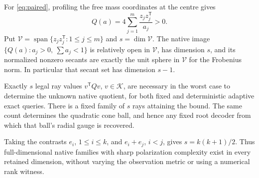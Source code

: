 \begin{theorem}\label{thm:paired}
For \eqref{eq:paired}, profiling the free mass coordinates at the centre gives
\begin{equation}\label{eq:paired-Q}
 Q(a)=4\sum_{j=1}^m\frac{z_jz_j^{\mathsf T}}{a_j}>0.
\end{equation}
Put $\mathcal V=\operatorname{span}\{z_jz_j^{\mathsf T}:1\le j\le m\}$ and $s=\dim\mathcal V$. The native image $\{Q(a):a_j>0,\ \sum a_j<1\}$ is relatively open in $\mathcal V$, has dimension $s$, and its normalized nonzero secants are exactly the unit sphere in $\mathcal V$ for the Frobenius norm. In particular that secant set has dimension $s-1$.

Exactly $s$ legal ray values $v^{\mathsf T}Qv$, $v\in\mathcal K$, are necessary in the worst case to determine the unknown native quotient, for both fixed and deterministic adaptive exact queries. There is a fixed family of $s$ rays attaining the bound. The same count determines the quadratic cone ball, and hence any fixed root decoder from which that ball's radial gauge is recovered.

Taking the contrasts $e_i$, $1\le i\le k$, and $e_i+e_j$, $i<j$, gives $s=k(k+1)/2$. Thus full-dimensional native families with sharp polarization complexity exist in every retained dimension, without varying the observation metric or using a numerical rank witness.
\end{theorem}
